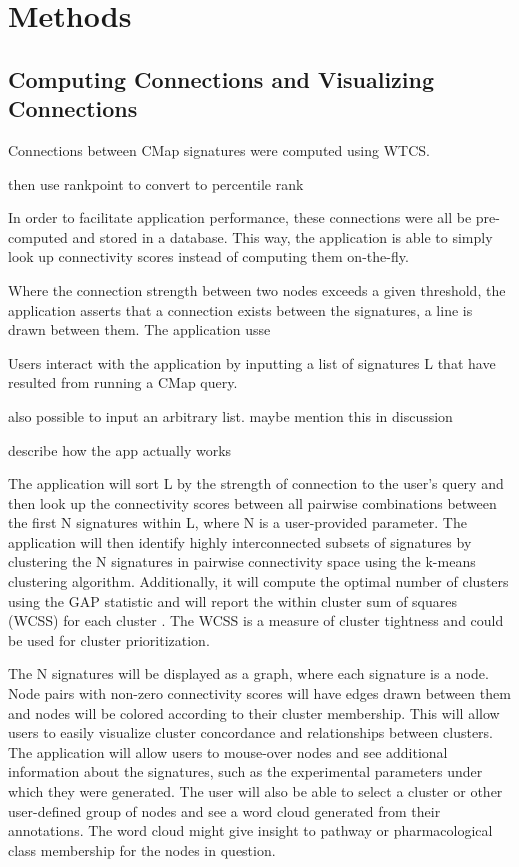 \documentclass[12pt]{article}
\begin{document}
\section{Methods}
\subsection{Computing Connections and Visualizing Connections}

Connections between CMap signatures were computed using WTCS. 

then use rankpoint to convert to percentile rank

In order to facilitate application performance, these connections were all be pre-computed and stored in a database. This way, the application is able to simply look up connectivity scores instead of computing them on-the-fly.

Where the connection strength between two nodes exceeds a given threshold, the application asserts that a connection exists between the signatures, a line is drawn between them. The application usse


Users interact with the application by inputting a list of signatures L that have resulted from running a CMap query. 

also possible to input an arbitrary list. maybe mention this in discussion


describe how the app actually works

The application will sort L by the strength of connection to the user's query and then look up the connectivity scores between all pairwise combinations between the first N signatures within L, where N is a user-provided parameter. The application will then identify highly interconnected subsets of signatures by clustering the N signatures in pairwise connectivity space using the k-means clustering algorithm\cite{lloyd_least_squares_1982}. Additionally, it will compute the optimal number of clusters using the GAP statistic and will report the within cluster sum of squares (WCSS) for each cluster \cite{tibshirani_estimating_2001}. The WCSS is a measure of cluster tightness and could be used for cluster prioritization.

The N signatures will be displayed as a graph, where each signature is a node. Node pairs with non-zero connectivity scores will have edges drawn between them and nodes will be colored according to their cluster membership. This will allow users to easily visualize cluster concordance and relationships between clusters. The application will allow users to mouse-over nodes and see additional information about the signatures, such as the experimental parameters under which they were generated. The user will also be able to select a cluster or other user-defined group of nodes and see a word cloud generated from their annotations. The word cloud might give insight to pathway or pharmacological class membership for the nodes in question.
\end{document}
